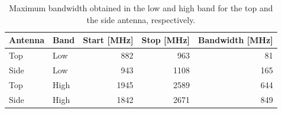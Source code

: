 \begin{table}
  \centering
  \begin{tabular}{|l|l|r|r|r|}
    \hline
    Antenna & Band & Start [MHz] & Stop [MHz] & Bandwidth [MHz] \\
    \hline
    Top     & Low  & 882         & 963       & 81 \\
    Side    & Low  & 943         & 1108        & 165 \\
    \hline
    Top     & High & 1945        & 2589       & 644 \\
    Side    & High & 1842        & 2671       & 849 \\
    \hline
  \end{tabular}
  \caption{Maximum bandwidth obtained in the low and high band for the top and the side antenna, respectively.}
  \label{tab:bw_sol1_6pf}
\end{table}

